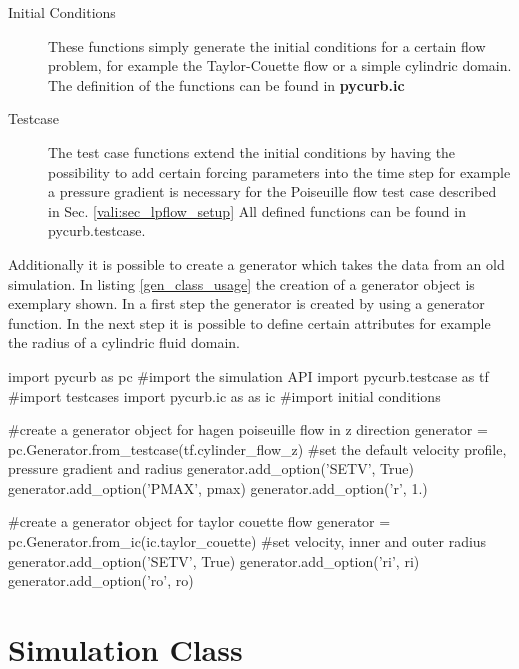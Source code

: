 \begin{description}
\item[Initial  Conditions] These functions simply generate the initial conditions for a certain flow problem, for example the Taylor-Couette
                            flow or a simple cylindric domain. The definition of the functions can be found in \textbf{pycurb.ic}
\item[Testcase] The test case functions extend the initial conditions by having the possibility to add certain forcing parameters into the time step
                for example a pressure gradient is necessary for the Poiseuille flow test case described in Sec. \ref{vali:sec_lpflow_setup}
                All defined functions can be found in pycurb.testcase.
\end{description}

Additionally it is possible to create a generator which takes the data from an old simulation. In listing \ref{gen_class_usage} the creation of a generator object is
exemplary shown. In a first step the generator is created by using a generator function. In the next step it is possible to define certain attributes
for example the radius of a cylindric fluid domain.\\

\begin{python} [caption='Generator class usage', label={gen_class_usage}]
import pycurb as pc #import the simulation API
import pycurb.testcase as tf #import testcases
import pycurb.ic as as ic    #import initial conditions

#create a generator object for hagen poiseuille flow in z direction
generator = pc.Generator.from_testcase(tf.cylinder_flow_z)
#set the default velocity profile, pressure gradient and radius
generator.add_option('SETV', True)
generator.add_option('PMAX', pmax)
generator.add_option('r', 1.)

#create a generator object for taylor couette flow
generator = pc.Generator.from_ic(ic.taylor_couette)
#set velocity, inner and outer radius
generator.add_option('SETV', True)
generator.add_option('ri', ri)
generator.add_option('ro', ro)
\end{python}

\section{Simulation Class}

